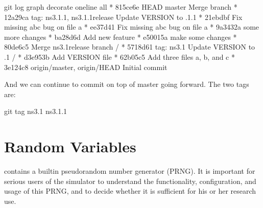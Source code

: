 \documentclass[letterpaper,10pt,english]{sphinxmanual}
\begin{document}
\begin{sphinxVerbatim}[commandchars=\\\{\}]
\PYGZdl{} git log \PYGZhy{}\PYGZhy{}graph \PYGZhy{}\PYGZhy{}decorate \PYGZhy{}\PYGZhy{}oneline \PYGZhy{}\PYGZhy{}all
*   815ce6e HEAD \PYGZhy{}\PYGZgt{} master Merge branch 
 * 12a29ca tag: ns\PYGZhy{}3.1.1, ns\PYGZhy{}3.1.1\PYGZhy{}release Update VERSION to .1.1
 * 21ebdbf Fix missing abc bug on file a
*  ee37d41 Fix missing abc bug on file a
*  9a3432a some more changes
*  ba28d6d Add new feature
*  e50015a make some changes
*    80de6c5 Merge ns\PYGZhy{}3.1\PYGZhy{}release branch
 /
 * 5718d61 tag: ns\PYGZhy{}3.1 Update VERSION to .1
/
* d3e953b Add VERSION file
* 62b05c5 Add three files a, b, and c
* 3e124c8 origin/master, origin/HEAD Initial commit
\end{sphinxVerbatim}

And we can continue to commit on top of master going forward.  The two
tags are:

\begin{sphinxVerbatim}[commandchars=\\\{\}]
\PYGZdl{} git tag
ns\PYGZhy{}3.1
ns\PYGZhy{}3.1.1
\end{sphinxVerbatim}


\chapter{Random Variables}
\label{\detokenize{random-variables:random-variables}}\label{\detokenize{random-variables::doc}}
 contains a built\sphinxhyphen{}in pseudo\sphinxhyphen{}random number generator (PRNG). It is important
for serious users of the simulator to understand the functionality,
configuration, and usage of this PRNG, and to decide whether it is sufficient
for his or her research use.
\end{document}

